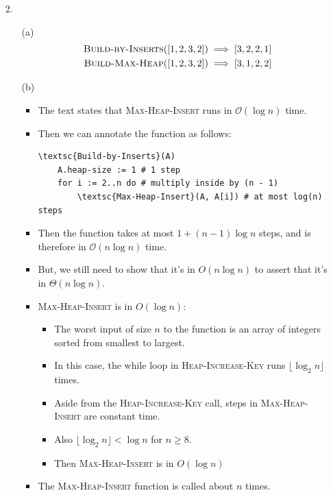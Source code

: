 \documentclass{article}
\begin{document}
\begin{enumerate}
\item [2.]
    \begin{enumerate}
    \item [(a)]
        \begin{equation*}
        \begin{aligned}
            \textsc{Build-by-Inserts}([1, 2, 3, 2]) & \implies [3, 2, 2, 1] \\
            \textsc{Build-Max-Heap}([1, 2, 3, 2]) & \implies [3, 1, 2, 2]
        \end{aligned}
        \end{equation*}
    \item [(b)]
        \begin{itemize}
        \item The text states that \textsc{Max-Heap-Insert} runs in $\mathcal{O}(\log n)$ time.
        \item Then we can annotate the function as follows:
            \begin{lstlisting}
\textsc{Build-by-Inserts}(A)
    A.heap-size := 1 # 1 step
    for i := 2..n do # multiply inside by (n - 1)
        \textsc{Max-Heap-Insert}(A, A[i]) # at most log(n) steps
            \end{lstlisting}
        \item Then the function takes at most $1 + (n - 1) \log n$ steps, and is therefore in $\mathcal{O}(n \log n)$ time.
        \item But, we still need to show that it's in $O(n \log n)$ to assert that it's in $\Theta(n \log n)$.
        \item \textsc{Max-Heap-Insert} is in $O(\log n)$:
            \begin{itemize}
            \item The worst input of size $n$ to the function is an array of integers sorted from smallest to largest.
            \item In this case, the while loop in \textsc{Heap-Increase-Key} runs $\lfloor \log_2 n \rfloor$ times.
            \item Aside from the \textsc{Heap-Increase-Key} call, steps in \textsc{Max-Heap-Insert} are constant time.
            \item Also $\lfloor \log_2 n \rfloor < \log n$ for $n \geq 8$.
            \item Then \textsc{Max-Heap-Insert} is in $O(\log n)$
            \end{itemize}
        \item The \textsc{Max-Heap-Insert} function is called about $n$ times.

\end{itemize}
\end{enumerate}
\end{enumerate}
\end{document}
